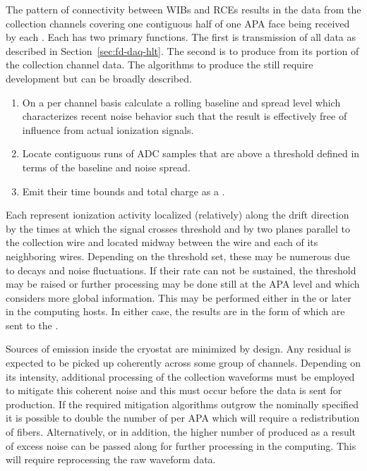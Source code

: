 The pattern of connectivity between WIBs and RCEs results in the data
from the collection channels covering one contiguous half of one APA
face being received by each .
Each  has two primary functions. 
The first is transmission of all data as described in
Section~\ref{sec:fd-daq-hlt}. 
The second is to produce  from its portion of the
collection channel data.
The algorithms to produce the  still require
development but can be broadly described.   

\begin{enumerate}
\item On a per channel basis calculate a rolling baseline and spread
  level which characterizes recent noise behavior such that the result
  is effectively free of influence from actual ionization signals.
\item Locate contiguous runs of ADC samples that are above a threshold
  defined in terms of the baseline and noise spread.
\item Emit their time bounds and total charge as a .
\end{enumerate}

Each  represent ionization activity localized
(relatively) along the drift direction by the times at which the
signal crosses threshold and by two planes parallel to the collection
wire and located midway between the wire and each of its neighboring
wires.
Depending on the threshold set, these  may be
numerous due to  decays and noise fluctuations.
If their rate can not be sustained, the threshold may be raised or
further processing may be done still at the APA level and which
considers more global information.
This may be performed either in the  or later in the
 computing hosts. 
In either case, the results are in the form of 
which are sent to the .

Sources of  emission inside the cryostat are minimized by
design. 
Any residual  is expected to be picked up coherently across
some group of channels. 
Depending on its intensity, additional processing of the collection
waveforms must be employed to mitigate this coherent noise and this
must occur before the data is sent for 
production. 
If the required mitigation algorithms outgrow the nominally specified
  it is possible to double the number of
 per APA which will require a redistribution of fibers. 
Alternatively, or in addition, the higher number of
 produced as a result of excess noise can be
passed along for further processing in the  computing. 
This will require reprocessing the raw waveform data.

